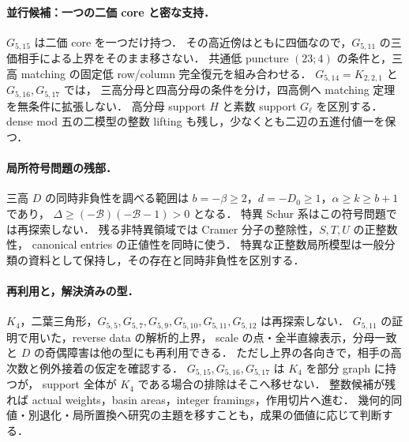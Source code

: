 \paragraph{並行候補：一つの二価 core と密な支持．}
$G_{5,15}$ は二価 core を一つだけ持つ．
その高近傍はともに四価なので，$G_{5,11}$ の三価相手による上界をそのまま移さない．
共通低 puncture $(23;4)$ の条件と，三高 matching の固定低 row/column 完全復元を組み合わせる．
$G_{5,14}=K_{2,2,1}$ と $G_{5,16},G_{5,17}$ では，
三高分母と四高分母の条件を分け，四高側へ matching 定理を無条件に拡張しない．
高分母 support $H$ と素数 support $G_\ell$ を区別する．
dense mod 五の二模型の整数 lifting も残し，少なくとも二辺の五進付値一を保つ．

\paragraph{局所符号問題の残部．}
三高 $D$ の同時非負性を調べる範囲は
$b=-\beta\ge2$，$d=-D_0\ge1$，$\alpha\ge k\ge b+1$ であり，
$\Delta\ge(-\mathcal B)(-\mathcal B-1)>0$ となる．
特異 Schur 系はこの符号問題では再探索しない．
残る非特異領域では Cramer 分子の整除性，$S,T,U$ の正整数性，
canonical entries の正値性を同時に使う．
特異な正整数局所模型は一般分類の資料として保持し，その存在と同時非負性を区別する．

\paragraph{再利用と，解決済みの型．}
$K_4$，二葉三角形，$G_{5,5},G_{5,7},G_{5,9},G_{5,10},G_{5,11},G_{5,12}$ は再探索しない．
$G_{5,11}$ の証明で用いた，reverse data の解析的上界，
scale の点・全半直線表示，分母一致と $D$ の奇偶障害は他の型にも再利用できる．
ただし上界の各向きで，相手の高次数と例外接着の仮定を確認する．
$G_{5,15},G_{5,16},G_{5,17}$ は $K_4$ を部分 graph に持つが，
support 全体が $K_4$ である場合の排除はそこへ移せない．
整数候補が残れば actual weights，basin areas，integer framings，作用切片へ進む．
幾何的同値・別退化・局所置換へ研究の主題を移すことも，成果の価値に応じて判断する．
